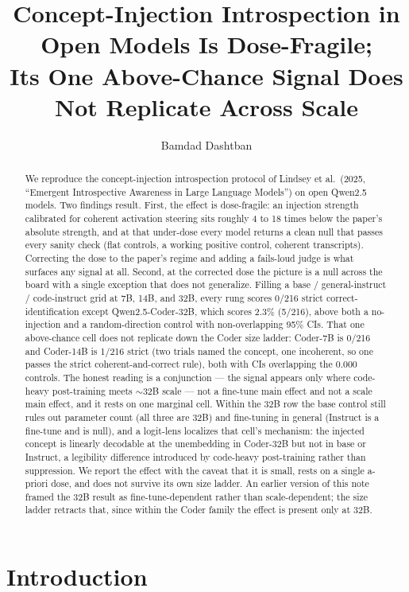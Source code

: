 \documentclass[11pt]{article}
\title{Concept-Injection Introspection in Open Models Is Dose-Fragile;\\
Its One Above-Chance Signal Does Not Replicate Across Scale}
\author{Bamdad Dashtban}
\date{}
\begin{document}
\maketitle

\begin{abstract}
We reproduce the concept-injection introspection protocol of Lindsey et al.\ (2025, ``Emergent Introspective Awareness in Large Language Models'') on open Qwen2.5 models. Two findings result. First, the effect is dose-fragile: an injection strength calibrated for coherent activation steering sits roughly 4 to 18 times below the paper's absolute strength, and at that under-dose every model returns a clean null that passes every sanity check (flat controls, a working positive control, coherent transcripts). Correcting the dose to the paper's regime and adding a fails-loud judge is what surfaces any signal at all. Second, at the corrected dose the picture is a null across the board with a single exception that does not generalize. Filling a base / general-instruct / code-instruct grid at 7B, 14B, and 32B, every rung scores 0/216 strict correct-identification except Qwen2.5-Coder-32B, which scores 2.3\% (5/216), above both a no-injection and a random-direction control with non-overlapping 95\% CIs. That one above-chance cell does not replicate down the Coder size ladder: Coder-7B is 0/216 and Coder-14B is 1/216 strict (two trials named the concept, one incoherent, so one passes the strict coherent-and-correct rule), both with CIs overlapping the 0.000 controls. The honest reading is a conjunction --- the signal appears only where code-heavy post-training meets $\sim$32B scale --- not a fine-tune main effect and not a scale main effect, and it rests on one marginal cell. Within the 32B row the base control still rules out parameter count (all three are 32B) and fine-tuning in general (Instruct is a fine-tune and is null), and a logit-lens localizes that cell's mechanism: the injected concept is linearly decodable at the unembedding in Coder-32B but not in base or Instruct, a legibility difference introduced by code-heavy post-training rather than suppression. We report the effect with the caveat that it is small, rests on a single a-priori dose, and does not survive its own size ladder. An earlier version of this note framed the 32B result as fine-tune-dependent rather than scale-dependent; the size ladder retracts that, since within the Coder family the effect is present only at 32B.
\end{abstract}

\section{Introduction}
\end{document}
